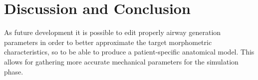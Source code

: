 \section{Discussion and Conclusion}

As future development it is possible to edit properly airway
generation parameters in order to better approximate the target
morphometric characteristics, so to be able to produce a
patient-specific anatomical model.  This allows for gathering more
accurate mechanical parameters for the simulation phase.

